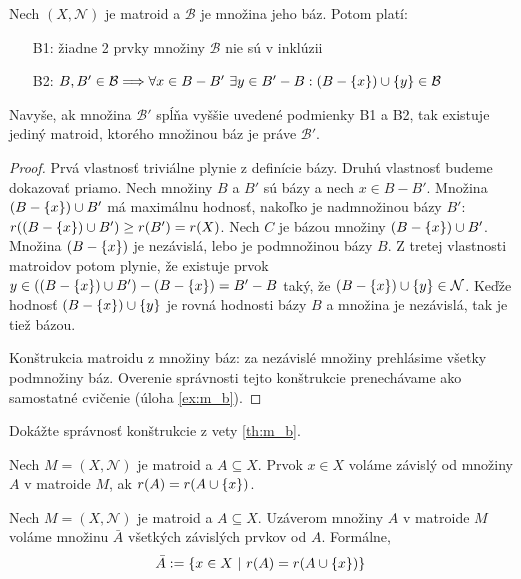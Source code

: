 \begin{theorem}
\label{th:m_b}
Nech $(X, \mathcal{N})$ je matroid a $\mathcal{B}$ je množina jeho báz. Potom platí:
\begin{enumerate}
    \item[B1:] žiadne 2 prvky množiny $\mathcal{B}$ nie sú v inklúzii
    \item[B2:] $B, B' \in \mathcal{B} \Longrightarrow \forall x \in B - B' ~\exists y \in B' - B: (B-\left\{x\right\}) \cup \left\{y\right\} \in \mathcal{B}$
\end{enumerate}

Navyše, ak množina $\mathcal{B}'$ spĺňa vyššie uvedené podmienky B1 a B2, tak existuje jediný matroid, ktorého množinou báz je práve $\mathcal{B}'$.
\end{theorem}
\begin{toreview}
\begin{proof}
Prvá vlastnosť triviálne plynie z definície bázy.
Druhú vlastnosť budeme dokazovať priamo.
Nech množiny $B$ a $B'$ sú bázy a nech $x \in B - B'$.
Množina $(B - \left\{x\right\}) \cup B'$ má maximálnu hodnosť, nakoľko je nadmnožinou bázy $B'$: $r((B - \left\{x\right\}) \cup B') \geq r(B') = r(X)$. Nech $C$ je bázou množiny $(B - \left\{x\right\}) \cup B'$.
Množina $(B - \left\{x\right\})$ je nezávislá, lebo je podmnožinou bázy $B$.
Z tretej vlastnosti matroidov potom plynie, že existuje prvok $y \in ((B - \left\{x\right\}) \cup B') -(B - \left\{x\right\}) = B' - B$ taký, že $(B - \left\{x\right\}) \cup \left\{y\right\} \in \mathcal{N}$.
Keďže hodnosť $(B - \left\{x\right\}) \cup \left\{y\right\}$ je rovná hodnosti bázy $B$ a množina je nezávislá, tak je tiež bázou.

Konštrukcia matroidu z množiny báz: za nezávislé množiny prehlásime všetky podmnožiny báz.
Overenie správnosti tejto konštrukcie prenechávame ako samostatné cvičenie (úloha \ref{ex:m_b}).
\end{proof}
\begin{exercise}
\label{ex:m_b}
Dokážte správnosť konštrukcie z vety \ref{th:m_b}.
\end{exercise}
\end{toreview}

\begin{definition}
Nech $M = (X, \mathcal{N})$ je matroid a $A \subseteq X$. Prvok $x \in X$ voláme závislý od množiny $A$ v matroide $M$, ak $r(A) = r(A \cup \left\{x\right\})$.
\end{definition}

\begin{definition}
Nech $M = (X, \mathcal{N})$ je matroid a $A \subseteq X$. Uzáverom množiny $A$ v matroide $M$ voláme množinu $\bar{A}$ všetkých závislých prvkov od $A$. Formálne,
$$\bar{A} := \left\{x \in X ~|~ r(A) = r(A \cup \left\{x\right\})\right\}$$
\end{definition}

